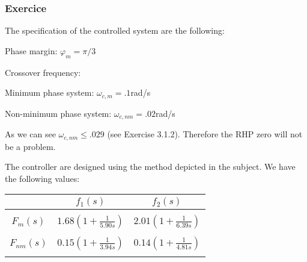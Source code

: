 \subsubsection{Exercice}

The specification of the controlled system are the following:

\begin{shortitemize}
    \item Phase margin: $\varphi_m = \pi/3$
    \item Crossover frequency: 
        \begin{shortitemize}
            \item Minimum phase system: $\omega_{c,m} = .1$rad/s
            \item Non-minimum phase system: $\omega_{c,nm} = .02$rad/s
        \end{shortitemize}
\end{shortitemize}

As we can see $\omega_{c,nm} \leq .029$ (see Exercise 3.1.2). Therefore the RHP zero will not be a problem.

The controller are designed using the method depicted in the subject. 
We have the following values:

\begin{center}
    \begin{tabular}{|c|cc|}
        \hline
        & $f_1(s)$ & $f_2(s)$ \\
        \hline
        & & \\
        $F_{m}(s)$ &
        $ 1.68 (1 + \frac{1}{5.90s}) $ &
        $ 2.01 (1 + \frac{1}{6.39s}) $  \\ 
        & & \\
        $F_{nm}(s)$ & 
        $ 0.15 (1 + \frac{1}{3.94s}) $ &
        $ 0.14 (1 + \frac{1}{4.81s}) $ \\
        & & \\
       \hline 
    \end{tabular}
\end{center}
